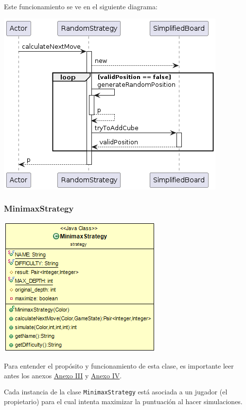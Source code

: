 \documentclass[../DocumentoOficial.tex]{subfiles}
\begin{document}
Este funcionamiento se ve en el siguiente diagrama:

\begin{center}
\includegraphics[scale=0.75]{RandomStrategy.calculateNextMove()-sprint7.png} 
\end{center}

\subsubsection{MinimaxStrategy}

\begin{center}
\includegraphics[scale=0.75]{MinimaxStrategy-sprint7.png} 
\end{center}

\label{subsubsec:MinimaxStrategy}
Para entender el propósito y funcionamiento de esta clase, es importante leer antes los anexos \hyperref[ch:AnexoIII]{Anexo III} y \hyperref[ch:AnexoIV]{Anexo IV}.

Cada instancia de la clase \texttt{MinimaxStrategy} está asociada a un jugador (el propietario) para el cual intenta maximizar la puntuación al hacer simulaciones.
\end{document}
